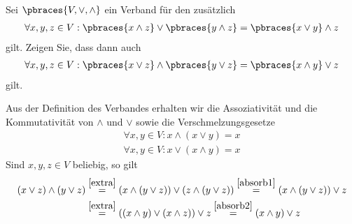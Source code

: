 \begin{exercise}
    Sei $\pbraces{V, \lor, \land}$ ein Verband für den zusätzlich
    \begin{align}
        \forall x,y,z \in V: \pbraces{x \land z} \lor \pbraces{y \land z} = \pbraces{x \lor y} \land z \label{extra}
    \end{align}
    gilt. Zeigen Sie, dass dann auch 
    \begin{align*}
        \forall x,y,z \in V: \pbraces{x \lor z} \land \pbraces{y \lor z} = \pbraces{x \land y} \lor z
    \end{align*}
    gilt.
\end{exercise}

\begin{solution}
    Aus der Definition des Verbandes erhalten wir die Assoziativität und die Kommutativität von $\land$ und $\lor$ sowie die Verschmelzungsgesetze
    \begin{align}
        \forall x,y \in V: x \land (x \lor y) = x  \label{absorb1} \\
        \forall x,y \in V: x \lor (x \land y) = x \label{absorb2}
    \end{align}
    Sind $x,y,z \in V$ beliebig, so gilt
    \begin{align*}
        (x \lor z) \land (y \lor z)  &\stackrel{\eqref{extra}}{=} (x \land (y \lor z)) \lor (z \land (y \lor z)) \stackrel{\eqref{absorb1}}{=} (x \land (y \lor z)) \lor z \\
        &\stackrel{\eqref{extra}}{=} ((x \land y) \lor (x \land z)) \lor z \stackrel{\eqref{absorb2}}{=} (x \land y) \lor z
    \end{align*}
\end{solution}